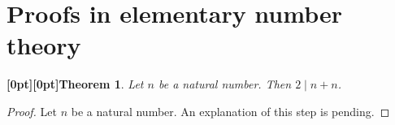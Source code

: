 \documentclass{article}
\makeatletter
\newcommand{\paperanchor}[1]{\hypertarget{#1}{}}%
\def\paperdest{\pdfextension dest}\def\paperstart{\pdfextension startlink}%
\def\paperend{\pdfextension endlink}\def\papercolor{\pdfextension colorstack}%
\let\paperdest\pdfdest\let\paperstart\pdfstartlink\let\paperend\pdfendlink\let\papercolor\pdfcolorstack
\newcommand{\paperanchor}[1]{\paperdest name{#1} xyz}%
\newcommand{\paperanchor}[1]{\special{pdf:dest (#1) [@thispage /XYZ null @ypos null]}}%
\newcommand{\paperlineanchor}[1]{\raisebox{10pt}[0pt][0pt]{\paperanchor{#1}}}
\DeclareRobustCommand{\paperresultname}[1]{\paperlineanchor{theorem:\arabic{theorem}}#1}
\newtheorem{theorem}{\paperresultname{Theorem}}
\makeatother
\begin{document}
\section*{Proofs in elementary number theory}

\begin{theorem}\label{theorem:1}
Let \(n\) be a natural number. Then \(2 \mid n + n\).
\end{theorem}

\begin{proof}
Let \(n\) be a natural number.
An explanation of this step is pending.
\renewcommand{\qedsymbol}{}
\end{proof}
\end{document}
